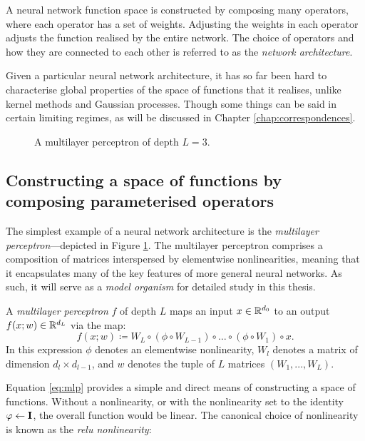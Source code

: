 \begin{refsection}
A neural network function space is constructed by composing many operators, where each operator has a set of weights. Adjusting the weights in each operator adjusts the function realised by the entire network. The choice of operators and how they are connected to each other is referred to as the \textit{network architecture}. 

Given a particular neural network architecture, it has so far been hard to characterise global properties of the space of functions that it realises, unlike kernel methods and Gaussian processes. Though some things can be said in certain limiting regimes, as will be discussed in Chapter \ref{chap:correspondences}.

\begin{figure}
    \centering
    
    \caption[A multilayer perceptron]{A multilayer perceptron of depth $L=3$.}
    \label{fig:mlp}
\end{figure}

\subsection{Constructing a space of functions by composing parameterised operators}

The simplest example of a neural network architecture is the \textit{multilayer perceptron}---depicted in Figure \ref{fig:mlp}. The multilayer perceptron comprises a composition of matrices interspersed by elementwise nonlinearities, meaning that it encapsulates many of the key features of more general neural networks. As such, it will serve as a \textit{model organism} for detailed study in this thesis.

\begin{definition}\label{def:mlp}
A \textit{multilayer perceptron} $f$ of depth $L$ maps an input $x\in\mathbb{R}^{d_0}$ to an output $f(x;w) \in \mathbb{R}^{d_L}$ via the map:
\begin{equation}\label{eq:mlp}
f(x; w) \coloneqq W_L \circ (\phi \circ W_{L - 1})\circ \dots \circ (\phi \circ W_1)\circ x.
\end{equation}
In this expression $\phi$ denotes an elementwise nonlinearity, $W_l$ denotes a matrix of dimension $d_l\times d_{l-1}$, and $w$ denotes the tuple of $L$ matrices $(W_1,...,W_L)$.
\end{definition}

Equation \ref{eq:mlp} provides a simple and direct means of constructing a space of functions. Without a nonlinearity, or with the nonlinearity set to the identity $\varphi \gets \mathbf{I}$, the overall function would be linear. The canonical choice of nonlinearity is known as the \textit{relu nonlinearity}:


\end{refsection}
